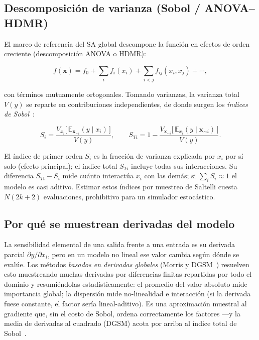 \subsection{Descomposición de varianza (Sobol / ANOVA--HDMR)}\label{sec:sobol}

El marco de referencia del SA global descompone la función en efectos de orden
creciente (descomposición ANOVA o HDMR):

\begin{equation}
f(\mathbf{x}) = f_0 + \sum_i f_i(x_i) + \sum_{i<j} f_{ij}(x_i,x_j) + \cdots,
\label{eq:hdmr}
\end{equation}

con términos mutuamente ortogonales. Tomando varianzas, la varianza total $V(y)$ se
reparte en contribuciones independientes, de donde surgen los \emph{índices de
Sobol}~\cite{sobol2001,saltelli2008}:

\begin{equation}
S_i = \frac{V_{x_i}\!\bigl[\,\mathbb{E}_{\mathbf{x}_{\sim i}}(y\mid x_i)\,\bigr]}{V(y)},
\qquad
S_{Ti} = 1 - \frac{V_{\mathbf{x}_{\sim i}}\!\bigl[\,\mathbb{E}_{x_i}(y\mid \mathbf{x}_{\sim i})\,\bigr]}{V(y)} .
\label{eq:sobol}
\end{equation}

El índice de primer orden $S_i$ es la fracción de varianza explicada por $x_i$ por
sí solo (efecto principal); el índice total $S_{Ti}$ incluye todas sus
interacciones. Su diferencia $S_{Ti}-S_i$ mide cuánto interactúa $x_i$ con las
demás; si $\sum_i S_i\approx1$ el modelo es casi aditivo. Estimar estos índices por
muestreo de Saltelli cuesta $N(2k+2)$ evaluaciones, prohibitivo para un simulador
estocástico.

\subsection{Por qué se muestrean derivadas del modelo}\label{sec:derivadas}

La sensibilidad elemental de una salida frente a una entrada es su derivada parcial
$\partial y/\partial x_i$, pero en un modelo no lineal ese valor cambia según dónde
se evalúe. Los métodos \emph{basados en derivadas globales} (Morris y
DGSM~\cite{kucherenko2009}) resuelven esto muestreando muchas derivadas por
diferencias finitas repartidas por todo el dominio y resumiéndolas
estadísticamente: el promedio del valor absoluto mide importancia global; la
dispersión mide no-linealidad e interacción (si la derivada fuese constante, el
factor sería lineal-aditivo). Es una aproximación muestral al gradiente que, sin el
costo de Sobol, ordena correctamente los factores —y la media de derivadas al
cuadrado (DGSM) acota por arriba al índice total de Sobol~\cite{kucherenko2009}.

